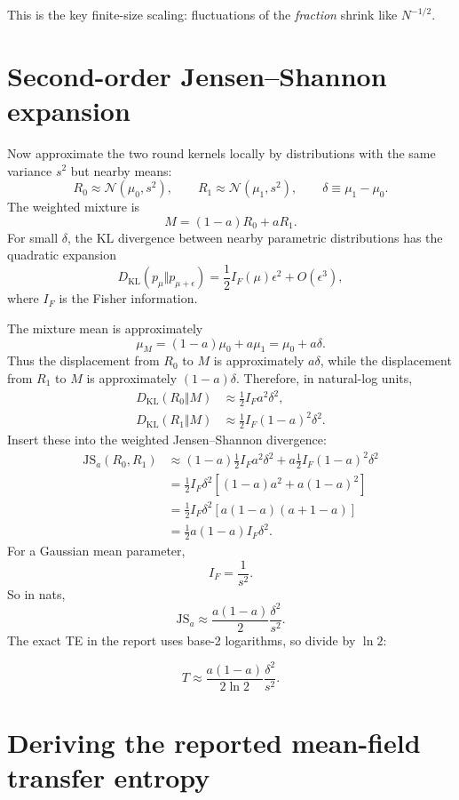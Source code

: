 \documentclass[11pt,a4paper]{article}
\newcommand{\KL}{D_{\mathrm{KL}}}
\newcommand{\JS}{\mathrm{JS}}
\newcommand{\1}{\mathbbm{1}}
\begin{document}
This is the key finite-size scaling: fluctuations of the \emph{fraction} shrink like $N^{-1/2}$.

\section{Second-order Jensen--Shannon expansion}

Now approximate the two round kernels locally by distributions with the same variance $s^2$ but nearby means:
\[
R_0\approx\mathcal N(\mu_0,s^2),
\qquad
R_1\approx\mathcal N(\mu_1,s^2),
\qquad
\delta\equiv\mu_1-\mu_0.
\]
The weighted mixture is
\[
M=(1-a)R_0+aR_1.
\]
For small $\delta$, the KL divergence between nearby parametric distributions has the quadratic expansion
\begin{equation}
\KL(p_{\mu}\Vert p_{\mu+\epsilon})
=\frac12 I_F(\mu)\epsilon^2+O(\epsilon^3),
\end{equation}
where $I_F$ is the Fisher information.

The mixture mean is approximately
\[
\mu_M=(1-a)\mu_0+a\mu_1=\mu_0+a\delta.
\]
Thus the displacement from $R_0$ to $M$ is approximately $a\delta$, while the displacement from $R_1$ to $M$ is approximately $(1-a)\delta$. Therefore, in natural-log units,
\begin{align}
\KL(R_0\Vert M)
&\approx\frac12 I_F a^2\delta^2,\\
\KL(R_1\Vert M)
&\approx\frac12 I_F (1-a)^2\delta^2.
\end{align}
Insert these into the weighted Jensen--Shannon divergence:
\begin{align}
\JS_a(R_0,R_1)
&\approx(1-a)\frac12I_Fa^2\delta^2
+a\frac12I_F(1-a)^2\delta^2\\
&=\frac12I_F\delta^2
\left[(1-a)a^2+a(1-a)^2\right]\\
&=\frac12I_F\delta^2
\left[a(1-a)(a+1-a)\right]\\
&=\frac12a(1-a)I_F\delta^2.
\end{align}
For a Gaussian mean parameter,
\[
I_F=\frac1{s^2}.
\]
So in nats,
\[
\JS_a\approx\frac{a(1-a)}{2}\frac{\delta^2}{s^2}.
\]
The exact TE in the report uses base-2 logarithms, so divide by $\ln2$:
\begin{resultbox}
\begin{equation}
\boxed{
T\approx\frac{a(1-a)}{2\ln2}\frac{\delta^2}{s^2}.}
\label{eq:JSsmall}
\end{equation}
\end{resultbox}

\section{Deriving the reported mean-field transfer entropy}
\end{document}
